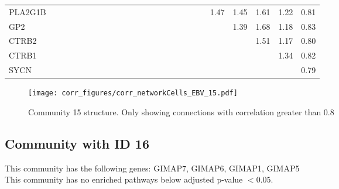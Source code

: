 \begin{longtable}{lrrrrrrrrrrrrrrrrrrrrrrrr}
PLA2G1B  &              &              &              &              &             &             &             &             &            &              &            &            &            &             &             &           &             &                &               &      1.47 &        1.45 &        1.61 &       1.22 &        0.81 \\
GP2      &              &              &              &              &             &             &             &             &            &              &            &            &            &             &             &           &             &                &               &           &        1.39 &        1.68 &       1.18 &        0.83 \\
CTRB2    &              &              &              &              &             &             &             &             &            &              &            &            &            &             &             &           &             &                &               &           &             &        1.51 &       1.17 &        0.80 \\
CTRB1    &              &              &              &              &             &             &             &             &            &              &            &            &            &             &             &           &             &                &               &           &             &             &       1.34 &        0.82 \\
SYCN     &              &              &              &              &             &             &             &             &            &              &            &            &            &             &             &           &             &                &               &           &             &             &            &        0.79 \\
\end{longtable}


\begin{figure}[h!]
\centering
\texttt{[image: corr\_figures/corr\_networkCells\_EBV\_15.pdf]}
\caption{Community 15 structure. Only showing connections with correlation greater than 0.8}
\end{figure}




\subsection*{Community with ID 16}
This community has the following genes: GIMAP7, GIMAP6, GIMAP1, GIMAP5
\\
This community has no enriched pathways below adjusted p-value $< 0.05$.

